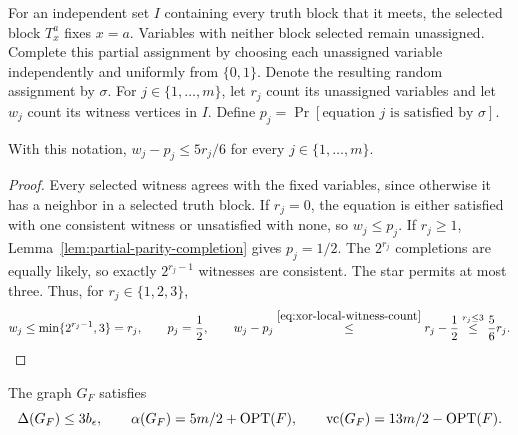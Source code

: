 For an independent set $I$ containing every truth block that it
meets, the selected block $T_x^a$ fixes $x=a$. Variables with neither
block selected remain unassigned. Complete this partial assignment by
choosing each unassigned variable independently and uniformly from
$\{0,1\}$. Denote the resulting random assignment by $\sigma$.
For $j\in\{1,\ldots,m\}$, let $r_j$ count its unassigned variables
and let $w_j$ count its witness vertices in $I$. Define
$p_j=\Pr[\text{equation }j\text{ is satisfied by }\sigma]$.

\begin{lemma}
\label{lem:xor-witness-excess}
With this notation, $w_j-p_j\le5r_j/6$ for every $j\in\{1,\ldots,m\}$.
\end{lemma}

\begin{proof}
Every selected witness agrees with the fixed variables, since
otherwise it has a neighbor in a selected truth block.
If $r_j=0$, the equation is either satisfied with one consistent
witness or unsatisfied with none, so $w_j\leq p_j$.
If $r_j\geq1$, Lemma~\ref{lem:partial-parity-completion} gives
$p_j=1/2$. The $2^{r_j}$ completions are equally likely, so exactly
$2^{r_j-1}$ witnesses are consistent. The star permits at most three. Thus, for $r_j\in\{1,2,3\}$,
\begin{equation}\label{eq:xor-local-witness-count}
 w_j\leq\min\{2^{r_j-1},3\}=r_j,\qquad p_j=\frac12,\qquad w_j-p_j
 \overset{\eqref{eq:xor-local-witness-count}}{\leq}
 r_j-\frac12\overset{r_j\leq3}{\leq}\frac56r_j.
\end{equation}
\end{proof}

\begin{lemma}\label{lem:xor-cover}
The graph $G_F$ satisfies
\[
 \Delta(G_F)\leq3b_\epsilon,\qquad
 \alpha(G_F)=5m/2+\operatorname{OPT}(F),\qquad
 \operatorname{vc}(G_F)=13m/2-\operatorname{OPT}(F).
\]
\end{lemma}


